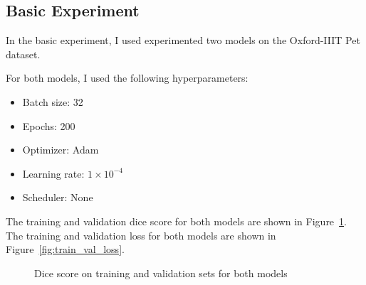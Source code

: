 \subsection{Basic Experiment}

In the basic experiment, I used experimented two models on the Oxford-IIIT Pet dataset.

For both models, I used the following hyperparameters:
\begin{itemize}
    \item Batch size: 32
    \item Epochs: 200
    \item Optimizer: Adam
    \item Learning rate: $1 \times 10^{-4}$
    \item Scheduler: None
\end{itemize}


The training and validation dice score for both models are shown in Figure~\ref{fig:train_val_dice}.
The training and validation loss for both models are shown in Figure~\ref{fig:train_val_loss}.

\def \unetexpdir {../log/u1/}
\def \resunetexpdir {../log/ru1/}
\begin{figure}[ht]
    \centering
    \caption{Dice score on training and validation sets for both models}
    \label{fig:train_val_dice}
\end{figure}


